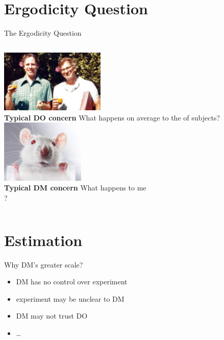 \section{Ergodicity Question}

\begin{frame}{The Ergodicity Question}
\begin{columns}[T]
	\includegraphics[height=3cm]{img/TverskyKahnemanFunny} \\
	\bc \textbf{Typical DO concern} \ec
	What happens on average to the  of subjects?
\centering \vspace{10em}  \red{\large $\neq$}
	\includegraphics[height=3cm]{img/LabRat} \\
	\bc \textbf{Typical DM concern} \ec
	What happens to me \\
	?
\end{columns}
\end{frame}


\section{Estimation}

\begin{frame}{Why DM's greater scale?}
\begin{itemize}
  \item DM has no control over experiment
  \item experiment may be unclear to DM
  \item DM may not trust DO
  \item \ldots
\end{itemize}
\end{frame}

